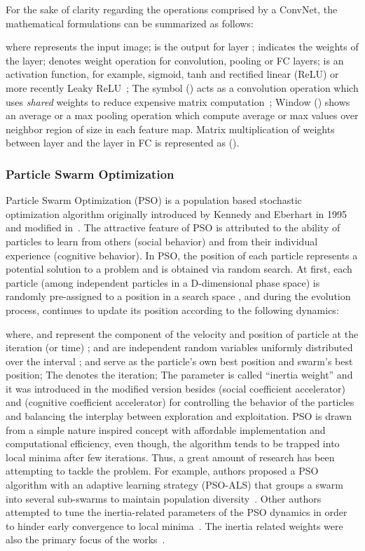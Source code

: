 \documentclass{ieeeaccess}
\begin{document}
For the sake of clarity regarding the operations comprised by a ConvNet, the mathematical formulations can be summarized as follows:

where  represents the input image;  is the output for layer ;  indicates the weights of the layer;  denotes weight operation for convolution, pooling or FC layers;  is an activation function, for example, sigmoid, tanh and rectified linear (ReLU) or more recently Leaky ReLU~\cite{maas2013rectifier}; The symbol () acts as a convolution operation which uses \textit{shared} weights to reduce expensive matrix computation~\cite{lecun2010convolutional}; Window () shows an average or a max pooling operation which compute average or max values over neighbor region of size  in each feature map. Matrix multiplication of weights between layer  and the layer  in FC is represented as ().
\subsubsection{Particle Swarm Optimization}
Particle Swarm Optimization (PSO) is a population based stochastic optimization algorithm originally introduced by Kennedy and Eberhart in 1995~\cite{kennedy1995particle} and modified in~\cite{shi1998modified}. The attractive feature of PSO is attributed to the ability of particles to learn from others (social behavior) and from their individual experience (cognitive behavior). In PSO, the position of each particle represents a potential solution to a problem and is obtained via random search. At first, each particle (among  independent particles in a D-dimensional phase space) is randomly pre-assigned to a position  in a search space , and during the evolution process, continues to update its position according to the following dynamics:

where,  and  represent the  component of the velocity and position of particle  at the iteration (or time) ;  and  are independent random variables uniformly distributed over the interval ;  and  serve as the particle's own best position and swarm's best position; The  denotes the iteration; The parameter  is called ``inertia weight'' and it was introduced in the modified version besides  (social coefficient accelerator) and  (cognitive coefficient accelerator) for controlling the behavior of the particles and balancing the interplay between exploration and exploitation. 
PSO is drawn from a simple nature inspired concept with affordable implementation and computational efficiency, even though, the algorithm tends to be trapped into local minima after few iterations. Thus, a great amount of research has been attempting to tackle the problem. For example, authors proposed a PSO algorithm with an adaptive learning strategy (PSO-ALS) that groups a swarm into several sub-swarms to maintain population diversity~\cite{zhang2020particle}. Other authors attempted to tune the inertia-related parameters of the PSO dynamics in order to hinder early convergence to local minima~\cite{han2018APSO}. The inertia related weights were also the primary focus of the works~\cite{LI2019a,bansal2011inertia,NICKABADI2011a,liu2016an}.
\end{document}
